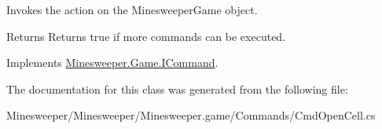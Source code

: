 Invokes the action on the Minesweeper\+Game object. 

\begin{DoxyReturn}{Returns}
Returns true if more commands can be executed.
\end{DoxyReturn}


Implements \hyperlink{interface_minesweeper_1_1_game_1_1_i_command_a03482e68480cad46a8cf419a87440cc9}{Minesweeper.\+Game.\+I\+Command}.



The documentation for this class was generated from the following file\+:\begin{DoxyCompactItemize}
\item 
Minesweeper/\+Minesweeper/\+Minesweeper.\+game/\+Commands/Cmd\+Open\+Cell.\+cs\end{DoxyCompactItemize}
